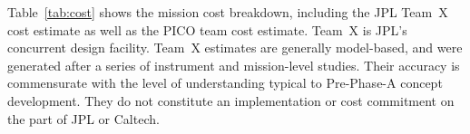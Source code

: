 Table~\ref{tab:cost} shows the mission cost breakdown, including the
JPL Team~X cost estimate as well as the PICO team cost estimate. Team~X
 is JPL's concurrent design facility. Team~X estimates are generally
model-based, and were generated after a series of instrument and
mission-level studies. Their accuracy is commensurate with the level
of understanding typical to Pre-Phase-A concept development. They do
not constitute an implementation or cost commitment on the part of JPL
or Caltech.

%


